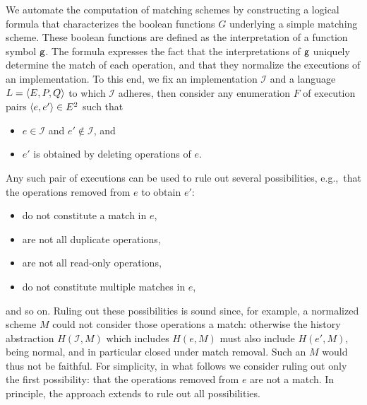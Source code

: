 We automate the computation of matching schemes by constructing a logical
formula that characterizes the boolean functions $G$ underlying a simple
matching scheme. These boolean functions are defined as the interpretation of
a function symbol ${\sf g}$.
The formula expresses the fact that the interpretations of ${\sf g}$ uniquely determine the match of each
operation, and that they normalize the executions of an
implementation. To this end, we fix an implementation $\mathcal{I}$ and a
language $L = {\left\langle{E,P,Q}\right\rangle}$ to which $\mathcal{I}$ adheres, then consider any
enumeration $F$ of execution pairs ${\left\langle{e,e'}\right\rangle} \in E^2$ such that
\begin{itemize}

  \item $e \in \mathcal{I}$ and $e' \not\in \mathcal{I}$, and

  \item $e'$ is obtained by deleting operations of $e$.

\end{itemize}
Any such pair of executions can be used to rule out several possibilities,
e.g.,~that the operations removed from $e$ to obtain $e'$:
\begin{itemize}

  \item do not constitute a match in $e$,

  \item are not all duplicate operations,

  \item are not all read-only operations,

  \item do not constitute multiple matches in $e$,

\end{itemize}
and so on. Ruling out these possibilities is sound since, for example, a
normalized scheme $M$ could not consider those operations a match: otherwise
the history abstraction $H(\mathcal{I},M)$ which includes $H(e,M)$ must also
include $H(e',M)$, being normal, and in particular closed under match removal.
Such an $M$ would thus not be faithful. For simplicity, in what follows we
consider ruling out only the first possibility: that the operations removed
from $e$ are not a match. In principle, the approach extends to rule out all
possibilities.

